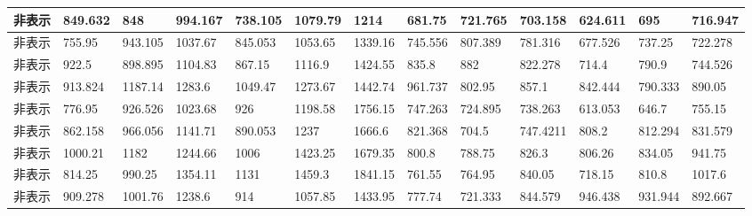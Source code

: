 \begin{tabularx}{\textwidth}{|c|L|L|L|L|L|L|L|L|L|L|L|L|}
    非表示                 & 849.632                      & 848                           & 994.167                       & 738.105                       & 1079.79     & 1214        & 681.75      & 721.765     & 703.158     & 624.611     & 695         & 716.947     \\ \hline
    非表示                 & 755.95                       & 943.105                       & 1037.67                       & 845.053                       & 1053.65     & 1339.16     & 745.556     & 807.389     & 781.316     & 677.526     & 737.25      & 722.278     \\ \hline
    非表示                 & 922.5                        & 898.895                       & 1104.83                       & 867.15                        & 1116.9      & 1424.55     & 835.8       & 882         & 822.278     & 714.4       & 790.9       & 744.526     \\ \hline
    非表示                 & 913.824                      & 1187.14                       & 1283.6                        & 1049.47                       & 1273.67     & 1442.74     & 961.737     & 802.95      & 857.1       & 842.444     & 790.333     & 890.05      \\ \hline
    非表示                 & 776.95                       & 926.526                       & 1023.68                       & 926                           & 1198.58     & 1756.15     & 747.263     & 724.895     & 738.263     & 613.053     & 646.7       & 755.15      \\ \hline
    非表示                 & 862.158                      & 966.056                       & 1141.71                       & 890.053                       & 1237        & 1666.6      & 821.368     & 704.5       & 747.4211    & 808.2       & 812.294     & 831.579     \\ \hline
    非表示                 & 1000.21                      & 1182                          & 1244.66                       & 1006                          & 1423.25     & 1679.35     & 800.8       & 788.75      & 826.3       & 806.26      & 834.05      & 941.75      \\ \hline
    非表示                 & 814.25                       & 990.25                        & 1354.11                       & 1131                          & 1459.3      & 1841.15     & 761.55      & 764.95      & 840.05      & 718.15      & 810.8       & 1017.6      \\ \hline
    非表示                 & 909.278                      & 1001.76                       & 1238.6                        & 914                           & 1057.85     & 1433.95     & 777.74      & 721.333     & 844.579     & 946.438     & 931.944     & 892.667     \\ \hline\hline

\end{tabularx}
